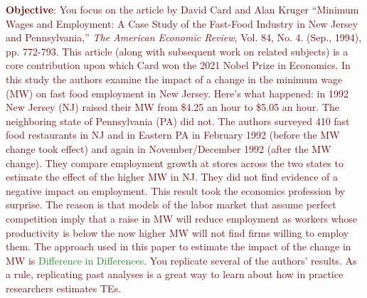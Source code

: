 \documentclass[
]{article}
\begin{document}
\noindent \textcolor{Maroon}{\textbf{Objective}: You focus on the article by David Card and Alan Kruger ``Minimum Wages and Employment: A Case Study of the Fast-Food Industry in New Jersey and Pennsylvania,'' \textit{The American Economic Review}, Vol. 84, No. 4. (Sep., 1994), pp. 772-793. This article (along with subsequent work on related subjects) is a core contribution upon which Card won the 2021 Nobel Prize in Economics. In this study the authors examine the impact of a change in the minimum wage (MW) on fast food employment in New Jersey. Here's what happened: in 1992 New Jersey (NJ) raised their MW from \$4.25 an hour to \$5.05 an hour. The neighboring state of Pennsylvania (PA) did not. The authors surveyed 410 fast food restaurants in NJ and in Eastern PA in February 1992 (before the MW change took effect) and again in November/December 1992 (after the MW change). They compare employment growth at stores across the two states to estimate the effect of the higher MW in NJ. They did not find evidence of a negative impact on employment. This result took the economics profession by surprise. The reason is that models of the labor market that assume perfect competition imply that a raise in MW will reduce employment as workers whose productivity is below the now higher MW will not find firms willing to employ them. The approach used in this paper to estimate the impact of the change in MW is \textcolor{ForestGreen}{Difference in Differences}. You replicate several of the authors' results. As a rule, replicating past analyses is a great way to learn about how in practice researchers estimates TEs.}
\end{document}
